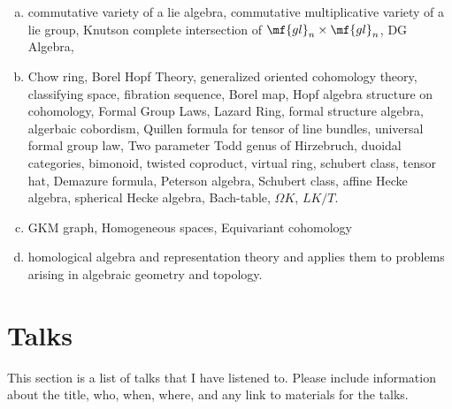 \documentclass[12pt]{article}
\begin{document}
\begin{enumerate}[(a)]
    \item commutative variety of a lie algebra, commutative multiplicative variety of a lie group, Knutson complete intersection of $\mf{gl}_n\times\mf{gl}_n$, DG Algebra,
    \item Chow ring, Borel Hopf Theory, generalized oriented cohomology theory, classifying space, fibration sequence, Borel map, Hopf algebra structure on cohomology, Formal Group Laws, Lazard Ring, formal structure algebra, algerbaic cobordism, Quillen formula for tensor of line bundles, universal formal group law,
            Two parameter Todd genus of Hirzebruch, duoidal categories, bimonoid, twisted coproduct, virtual ring, schubert class, tensor hat, Demazure formula, Peterson algebra, Schubert class, affine Hecke algebra, spherical Hecke algebra, Bach-table, $\Omega K$, $LK/T$.
    \item GKM graph, Homogeneous spaces, Equivariant cohomology
    \item homological algebra and representation theory and applies them to problems arising in algebraic geometry and topology. 
\end{enumerate}

\section{Talks}
This section is a list of talks that I have listened to. Please include information about the title, who, when, where, and any link to materials for the talks.
    
\end{document}
